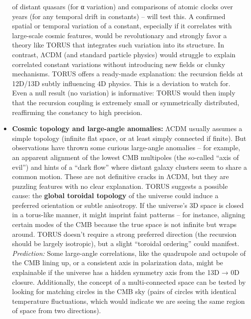 \documentclass[
]{article}
\begin{document}
\begin{itemize}
  of distant quasars (for α variation) and comparisons of atomic clocks
  over years (for any temporal drift in constants) -- will test
  this\hspace{0pt}. A confirmed spatial or temporal variation of a
  constant, especially if it correlates with large-scale cosmic
  features, would be revolutionary and strongly favor a theory like
  TORUS that integrates such variation into its structure. In contrast,
  ΛCDM (and standard particle physics) would struggle to explain
  correlated constant variations without introducing new fields or
  clunky mechanisms. TORUS offers a ready-made explanation: the
  recursion fields at 12D/13D subtly influencing 4D physics\hspace{0pt}.
  This is a deviation to watch for. Even a null result (no variation) is
  informative: TORUS would then imply that the recursion coupling is
  extremely small or symmetrically distributed, reaffirming the
  constancy to high precision.
\item
  \textbf{Cosmic topology and large-angle anomalies:} ΛCDM usually
  assumes a simple topology (infinite flat space, or at least simply
  connected if finite). But observations have thrown some curious
  large-angle anomalies -- for example, an apparent alignment of the
  lowest CMB multipoles (the so-called ``axis of evil'') and hints of a
  ``dark flow'' where distant galaxy clusters seem to share a common
  motion. These are not definitive cracks in ΛCDM, but they are puzzling
  features with no clear explanation. TORUS suggests a possible cause:
  the \textbf{global toroidal topology} of the universe could induce a
  preferred orientation or subtle anisotropy. If the universe's 3D space
  is closed in a torus-like manner, it might imprint faint patterns --
  for instance, aligning certain modes of the CMB because the true space
  is not infinite but wraps around. TORUS doesn't require a strong
  preferred direction (the recursion should be largely isotropic), but a
  slight ``toroidal ordering'' could manifest. \emph{Prediction:} Some
  large-angle correlations, like the quadrupole and octupole of the CMB
  lining up, or a consistent axis in polarization data, might be
  explainable if the universe has a hidden symmetry axis from the 13D →
  0D closure\hspace{0pt}. Additionally, the concept of a multi-connected
  space can be tested by looking for matching circles in the CMB sky
  (pairs of circles with identical temperature fluctuations, which would
  indicate we are seeing the same region of space from two directions).

\end{itemize}
\end{document}
